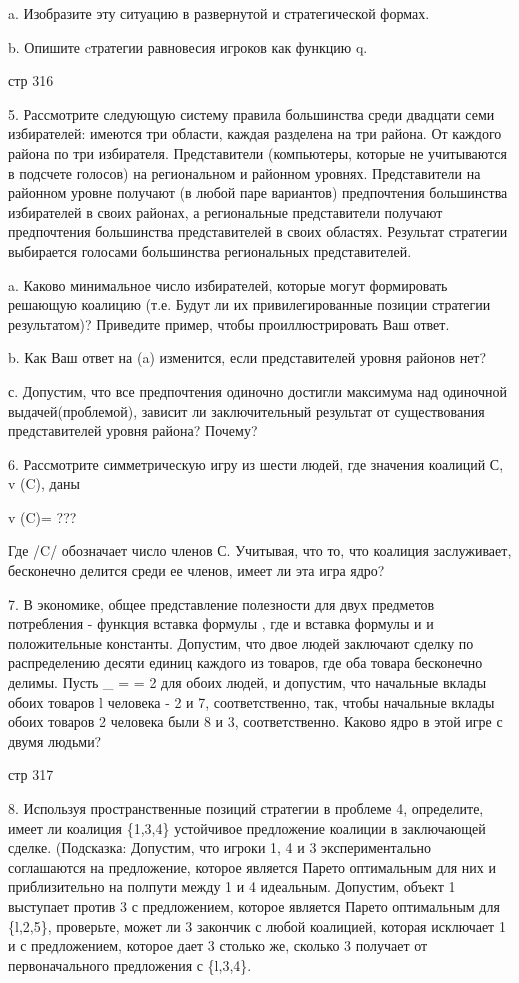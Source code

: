 \documentclass[a4paper,12pt]{article}
\begin{document}
a. Изобразите эту ситуацию в развернутой и
стратегической формах.

b. Опишите cтратегии равновесия игроков как функцию
q.

стр 316

5. Рассмотрите следующую систему правила
большинства среди двадцати семи избирателей:
имеются три области, каждая разделена на три
района. От каждого района по три избирателя.
Представители (компьютеры, которые не учитываются в
подсчете голосов) на региональном и районном
уровнях. Представители на районном уровне получают
(в любой паре вариантов) предпочтения большинства
избирателей в своих районах, а региональные
представители получают предпочтения большинства
представителей в своих областях. Результат
стратегии выбирается голосами большинства
региональных представителей.

a. Каково минимальное число избирателей, которые
могут формировать решающую коалицию (т.е. Будут ли
их привилегированные позиции стратегии
результатом)? Приведите пример, чтобы
проиллюстрировать Ваш ответ.

b. Как Ваш ответ на (a) изменится, если
представителей уровня районов нет?

с. Допустим, что все предпочтения одиночно достигли
максимума над одиночной выдачей(проблемой), зависит
ли заключительный результат от существования
представителей уровня района? Почему?

6. Рассмотрите симметрическую игру из шести людей,
где значения коалиций С, v (C), даны

v (C)= ???

Где /C/ обозначает число членов С. Учитывая, что
то, что коалиция заслуживает, бесконечно делится
среди ее членов, имеет ли эта игра ядро?

7. В экономике, общее представление полезности для
двух предметов потребления - функция вставка
формулы , где и вставка формулы и и положительные
константы. Допустим, что двое людей заключают
сделку по распределению десяти единиц каждого из
товаров, где оба товара бесконечно делимы. Пусть \_
= = 2 для обоих людей, и допустим, что начальные
вклады обоих товаров l человека - 2 и 7,
соответственно, так, чтобы начальные вклады обоих
товаров 2 человека были 8 и 3, соответственно.
Каково ядро в этой игре с двумя людьми?

стр 317

8. Используя пространственные позиций стратегии в
проблеме 4, определите, имеет ли коалиция \{1,3,4\}
устойчивое предложение коалиции в заключающей
сделке. (Подсказка: Допустим, что игроки 1, 4 и 3
экспериментально соглашаются на предложение,
которое является Парето оптимальным для них и
приблизительно на полпути между 1 и 4 идеальным.
Допустим, объект 1 выступает против 3 с
предложением, которое является Парето оптимальным
для \{l,2,5\}, проверьте, может ли 3 закончик с
любой коалицией, которая исключает 1 и с
предложением, которое дает 3 столько же, сколько 3
получает от первоначального предложения с
\{l,3,4\}.
\end{document}
